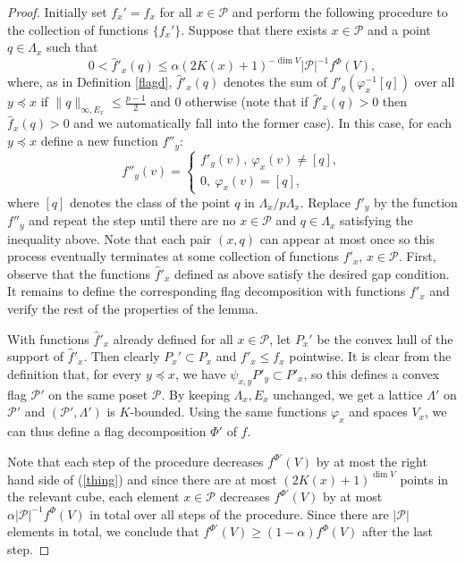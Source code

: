 \documentclass{daj}
\renewcommand{\le}{\leqslant}
\renewcommand{\ge}{\geqslant}
\renewcommand{\P}{\mathcal P}
\theoremstyle{definition}
\theoremstyle{remark}
\theoremstyle{definition}
\theoremstyle{definition}
\begin{document}
\begin{proof}
Initially set $f_x' = f_x$ for all $x \in \P$ and perform the following procedure to the collection of functions $\{f_x'\}$. Suppose that there exists $x \in \P$ and a point $q \in \Lambda_x$ such that
\begin{equation}\label{thing}
0 < \hat f'_x(q) \le \alpha (2K(x)+1)^{-\dim V}|\P|^{-1} f^\Phi(V),
\end{equation}
where, as in Definition \ref{flagd}, $\hat f'_x(q)$ denotes the sum of $f'_y(\varphi_x^{-1}[q])$ over all $y \preceq x$ if $\|q\|_{\infty, E_x} \le \frac{p-1}{2}$ and 0 otherwise (note that if $\hat f'_x(q)>0$ then $\hat f_x(q)>0$ and we automatically fall into the former case).
In this case, for each $y \preceq x$ define a new function $f''_y$:
\[
f''_y(v) = \begin{cases}
f'_y(v), ~ \varphi_x(v) \neq [q],\\
0, ~\varphi_x(v) = [q],
\end{cases}
\]
where $[q]$ denotes the class of the point $q$ in $\Lambda_x/p\Lambda_x$. Replace $f'_y$ by the function $f''_y$ and repeat the step until there are no $x \in \P$ and $q \in \Lambda_x$ satisfying the inequality above. Note that each pair $(x, q)$ can appear at most once so this process eventually terminates at some collection of functions $f'_x$, $x \in \P$. First, observe that the functions $\hat f'_x$ defined as above satisfy the desired gap condition. It remains to define the corresponding flag decomposition with functions $f'_x$ and verify the rest of the properties of the lemma.

With functions $\hat f'_x$ already defined for all $x\in \P$, let $P_x'$ be the convex hull of the support of $\hat f'_x$. Then clearly $P_x' \subset P_x$ and $f'_x \le f_x$ pointwise. It is clear from the definition that, for every $y \preceq x$, we have $\psi_{x, y} P'_y \subset P'_x$, so this defines a convex flag $\P'$ on the same poset $\P$. By keeping $\Lambda_x, E_x$ unchanged, we get a lattice $\Lambda'$ on $\P'$ and $(\P', \Lambda')$ is $K$-bounded. Using the same functions $\varphi_x$ and spaces $V_x$, we can thus define a flag decomposition $\Phi'$ of $f$.

Note that each step of the procedure decreases $f^{\Phi'}(V)$ by at most the right hand side of (\ref{thing}) and since there are at most $(2K(x)+1)^{\dim V}$ points in the relevant cube, each element $x \in \P$ decreases $f^{\Phi'}(V)$ by at most $\alpha |\P|^{-1} f^{\Phi}(V)$ in total over all steps of the procedure. Since there are $|\P|$ elements in total, we conclude that $f^{\Phi'}(V) \ge (1-\alpha) f^{\Phi}(V)$ after the last step.


\end{proof}
\end{document}
